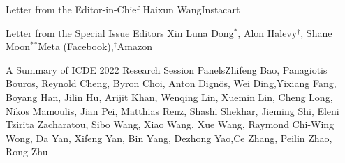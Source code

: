 \documentclass[11pt]{article}
\begin{document}


\begin{bulletin}


%
%

\begin{lettersection}


\begin{letter}{Letter from the Editor-in-Chief}
 {Haixun Wang}{Instacart}
 
\end{letter}

\newpage


\newpage

%
%
\begin{letter}{Letter from the Special Issue Editors} %
{Xin Luna Dong$^*$, Alon Halevy$^\dagger$, Shane Moon$^*$}{$^*$Meta (Facebook),$^\dagger$Amazon}

\end{letter}

\end{lettersection}
\begin{opinionsection}
    \setcounter{section}{0}
    \begin{opinion}{A Summary of ICDE 2022 Research Session Panels}{Zhifeng Bao, Panagiotis Bouros, Reynold Cheng, Byron Choi, Anton Dign\"{o}s, Wei Ding,Yixiang Fang, Boyang Han, Jilin Hu, Arijit Khan, Wenqing Lin, Xuemin Lin, Cheng Long, Nikos Mamoulis, Jian Pei, Matthias Renz, Shashi Shekhar, Jieming Shi, Eleni Tzirita Zacharatou, Sibo Wang, Xiao Wang, Xue Wang, Raymond Chi-Wing Wong, Da Yan, Xifeng Yan, Bin Yang, Dezhong Yao,Ce Zhang, Peilin Zhao, Rong Zhu}{}
    
    \end{opinion}
\end{opinionsection}


\end{bulletin}
\end{document}
